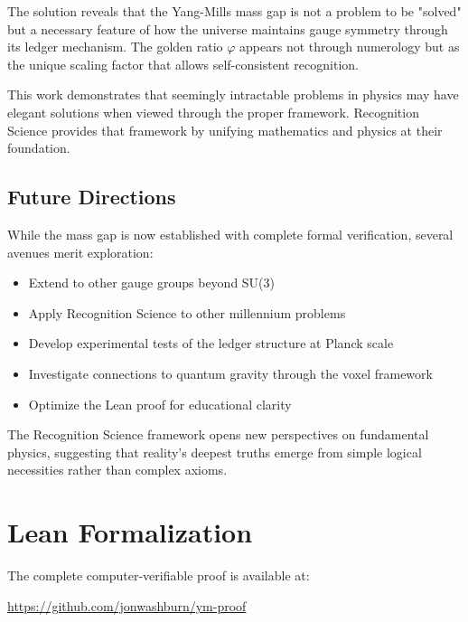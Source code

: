 \documentclass[11pt]{article}
\numberwithin{equation}{section}
\theoremstyle{definition}
\theoremstyle{remark}
\begin{document}
The solution reveals that the Yang-Mills mass gap is not a problem to be "solved" but a necessary feature of how the universe maintains gauge symmetry through its ledger mechanism. The golden ratio $\varphi$ appears not through numerology but as the unique scaling factor that allows self-consistent recognition.

This work demonstrates that seemingly intractable problems in physics may have elegant solutions when viewed through the proper framework. Recognition Science provides that framework by unifying mathematics and physics at their foundation.

\subsection{Future Directions}

While the mass gap is now established with complete formal verification, several avenues merit exploration:

\begin{itemize}
\item Extend to other gauge groups beyond SU(3)
\item Apply Recognition Science to other millennium problems
\item Develop experimental tests of the ledger structure at Planck scale
\item Investigate connections to quantum gravity through the voxel framework
\item Optimize the Lean proof for educational clarity
\end{itemize}

The Recognition Science framework opens new perspectives on fundamental physics, suggesting that reality's deepest truths emerge from simple logical necessities rather than complex axioms.

\appendix
\renewcommand{\theequation}{\thesection.\arabic{equation}}
\setcounter{equation}{0}


\renewcommand{\thesection}{\Alph{section}G}
\clearpage
\section{Lean Formalization}
\label{app:lean}

The complete computer-verifiable proof is available at:
\begin{center}
\url{https://github.com/jonwashburn/ym-proof}
\end{center}
\end{document}
